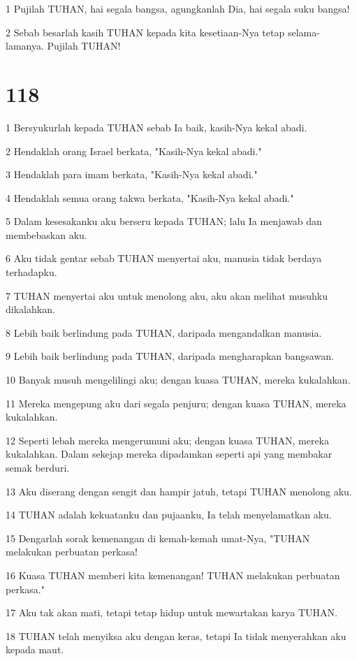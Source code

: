 \par 1 Pujilah TUHAN, hai segala bangsa, agungkanlah Dia, hai segala suku bangsa!
\par 2 Sebab besarlah kasih TUHAN kepada kita kesetiaan-Nya tetap selama-lamanya. Pujilah TUHAN!

\chapter{118}

\par 1 Bersyukurlah kepada TUHAN sebab Ia baik, kasih-Nya kekal abadi.
\par 2 Hendaklah orang Israel berkata, "Kasih-Nya kekal abadi."
\par 3 Hendaklah para imam berkata, "Kasih-Nya kekal abadi."
\par 4 Hendaklah semua orang takwa berkata, "Kasih-Nya kekal abadi."
\par 5 Dalam kesesakanku aku berseru kepada TUHAN; lalu Ia menjawab dan membebaskan aku.
\par 6 Aku tidak gentar sebab TUHAN menyertai aku, manusia tidak berdaya terhadapku.
\par 7 TUHAN menyertai aku untuk menolong aku, aku akan melihat musuhku dikalahkan.
\par 8 Lebih baik berlindung pada TUHAN, daripada mengandalkan manusia.
\par 9 Lebih baik berlindung pada TUHAN, daripada mengharapkan bangsawan.
\par 10 Banyak musuh mengelilingi aku; dengan kuasa TUHAN, mereka kukalahkan.
\par 11 Mereka mengepung aku dari segala penjuru; dengan kuasa TUHAN, mereka kukalahkan.
\par 12 Seperti lebah mereka mengerumuni aku; dengan kuasa TUHAN, mereka kukalahkan. Dalam sekejap mereka dipadamkan seperti api yang membakar semak berduri.
\par 13 Aku diserang dengan sengit dan hampir jatuh, tetapi TUHAN menolong aku.
\par 14 TUHAN adalah kekuatanku dan pujaanku, Ia telah menyelamatkan aku.
\par 15 Dengarlah sorak kemenangan di kemah-kemah umat-Nya, "TUHAN melakukan perbuatan perkasa!
\par 16 Kuasa TUHAN memberi kita kemenangan! TUHAN melakukan perbuatan perkasa."
\par 17 Aku tak akan mati, tetapi tetap hidup untuk mewartakan karya TUHAN.
\par 18 TUHAN telah menyiksa aku dengan keras, tetapi Ia tidak menyerahkan aku kepada maut.
